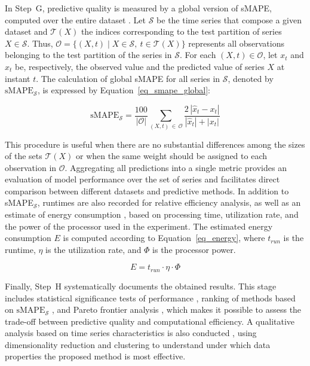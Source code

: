 \documentclass[final,3p,times,twocolumn,authoryear]{elsarticle}
\begin{document}
In Step~G, predictive quality is measured by a global version of sMAPE, computed over the entire dataset \citep{montero_principles_2021}. Let $\mathcal{S}$ be the time series that compose a given dataset and $\mathcal{T}(X)$ the indices corresponding to the test partition of series $X\in\mathcal{S}$. Thus, $\mathcal{O} = \{(X,t)\mid X\in\mathcal{S},\ t\in\mathcal{T}(X)\}$ represents all observations belonging to the test partition of the series in $\mathcal{S}$. For each $(X,t)\in\mathcal{O}$, let $x_t$ and $\hat{x}_t$ be, respectively, the observed value and the predicted value of series $X$ at instant $t$. The calculation of global sMAPE for all series in $\mathcal{S}$, denoted by $\mathrm{sMAPE}_{\mathcal{S}}$, is expressed by Equation~\ref{eq_smape_global}:

\begin{equation}
\label{eq_smape_global}
\mathrm{sMAPE}_{\mathcal{S}} = \frac{100}{|\mathcal{O}|} \sum_{(X,t)\, \in\, \mathcal{O}} \frac{2\,|\hat{x}_{t}-x_{t}|}{|\hat{x}_{t}|+|x_{t}|}
\end{equation}

This procedure is useful when there are no substantial differences among the sizes of the sets $\mathcal{T}(X)$ or when the same weight should be assigned to each observation in $\mathcal{O}$. Aggregating all predictions into a single metric provides an evaluation of model performance over the set of series and facilitates direct comparison between different datasets and predictive methods. In addition to sMAPE$_\mathcal{S}$, runtimes are also recorded for relative efficiency analysis, as well as an estimate of energy consumption \citep{shahid_improving_2021}, based on processing time, utilization rate, and the power of the processor used in the experiment. The estimated energy consumption $E$ is computed according to Equation~\ref{eq_energy}, where $t_{\textit{run}}$ is the runtime, $\eta$ is the utilization rate, and $\Phi$ is the processor power.

\begin{equation}
\label{eq_energy}
E = t_{\textit{run}} \cdot \eta \cdot \Phi
\end{equation}

Finally, Step~H systematically documents the obtained results. This stage includes statistical significance tests of performance \citep{montgomery_applied_2011}, ranking of methods based on $\mathrm{sMAPE}_{\mathcal{S}}$ \citep{koning_them3_2005, makridakis_m5_2022}, and Pareto frontier analysis \citep{yang_multi_2014}, which makes it possible to assess the trade-off between predictive quality and computational efficiency. A qualitative analysis based on time series characteristics is also conducted \citep{lubba_catch22_2019}, using dimensionality reduction and clustering \citep{han_data_2012} to understand under which data properties the proposed method is most effective.
\end{document}
